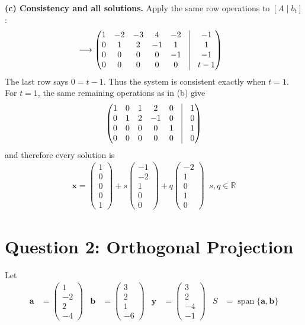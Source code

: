 \documentclass[11pt,a4paper]{article}
\newcommand{\R}{\mathbb{R}}
\begin{document}
\textbf{(c) Consistency and all solutions.} Apply the same row operations to $[A\mid b_t]$:
\begin{align*}
[A\mid b_t]
&\longrightarrow
\begin{pmatrix}
1&-2&-3&4&-2&\vline&-1\\
0&1&2&-1&1&\vline&1\\
0&0&0&0&-1&\vline&-1\\
0&0&0&0&0&\vline&t-1
\end{pmatrix}
\end{align*}
The last row says $0=t-1$. Thus the system is consistent exactly when $t=1$.
For $t=1$, the same remaining operations as in (b) give
\begin{align*}
\begin{pmatrix}
1&0&1&2&0&\vline&1\\
0&1&2&-1&0&\vline&0\\
0&0&0&0&1&\vline&1\\
0&0&0&0&0&\vline&0
\end{pmatrix}
\end{align*}
and therefore every solution is
\begin{align*}
\boxed{\displaystyle
\mathbf{x}=\begin{pmatrix}1\\0\\0\\0\\1\end{pmatrix}
+s\begin{pmatrix}-1\\-2\\1\\0\\0\end{pmatrix}
+q\begin{pmatrix}-2\\1\\0\\1\\0\end{pmatrix}
\;\;s,q\in\R}
\end{align*}

\clearpage
\section*{Question 2: Orthogonal Projection}
Let
\begin{align*}
\mathbf a&=\begin{pmatrix}1\\-2\\2\\-4\end{pmatrix}&
\mathbf b&=\begin{pmatrix}3\\2\\1\\-6\end{pmatrix}&
\mathbf y&=\begin{pmatrix}3\\2\\-4\\-1\end{pmatrix}&
S&=\operatorname{span}\{\mathbf a,\mathbf b\}
\end{align*}
\end{document}
